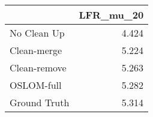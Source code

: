 \begin{tabular}{lr}
\toprule
{} & LFR_mu_20 \\
\midrule
No Clean Up  &     4.424 \\
Clean-merge  &     5.224 \\
Clean-remove &     5.263 \\
OSLOM-full   &     5.282 \\
Ground Truth &     5.314 \\
\bottomrule
\end{tabular}
